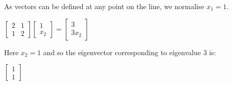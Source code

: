 As vectors can be defined at any point on the line, we normalise \(x_1=1\).

\(\begin{bmatrix}2&1\\1 & 2\end{bmatrix}\begin{bmatrix}1\\x_2\end{bmatrix}=\begin{bmatrix}3\\3x_2\end{bmatrix}\)

Here \(x_2=1\) and so the eigenvector corresponding to eigenvalue \(3\) is:

\(\begin{bmatrix}1\\1\end{bmatrix}\)

